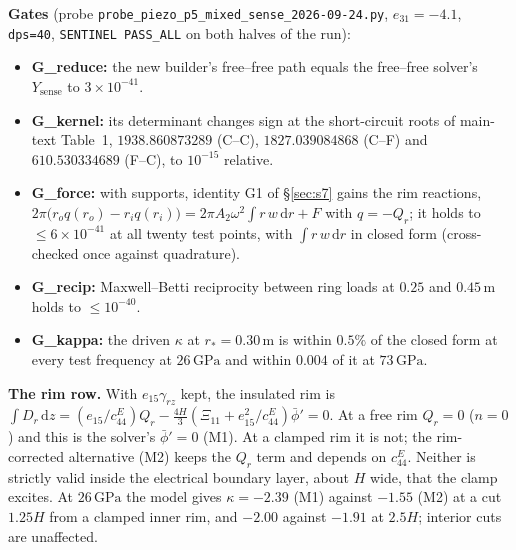 \documentclass[11pt]{article}
\begin{document}
\textbf{Gates} (probe \texttt{probe\_piezo\_p5\_mixed\_sense\_2026-09-24.py},
$e_{31}=-4.1$, \texttt{dps=40}, \texttt{SENTINEL PASS\_ALL} on both
halves of the run):
\begin{itemize}
\item \textbf{G\_reduce:} the new builder's free--free path equals the
free--free solver's $Y_{\mathrm{sense}}$ to $3\times10^{-41}$.
\item \textbf{G\_kernel:} its determinant changes sign at the
short-circuit roots of main-text Table~1, $1938.860873289$ (C--C),
$1827.039084868$ (C--F) and $610.530334689$ (F--C), to $10^{-15}$
relative.
\item \textbf{G\_force:} with supports, identity G1 of \S\ref{sec:s7}
gains the rim reactions,
$2\pi\bigl(r_oq(r_o)-r_iq(r_i)\bigr)=2\pi A_2\omega^2\int r\,w\,\mathrm dr+F$
with $q=-Q_r$; it holds to $\le6\times10^{-41}$ at all twenty test
points, with $\int r\,w\,\mathrm dr$ in closed form (cross-checked once
against quadrature).
\item \textbf{G\_recip:} Maxwell--Betti reciprocity between ring loads
at $0.25$ and $0.45\,\mathrm m$ holds to $\le10^{-40}$.
\item \textbf{G\_kappa:} the driven $\kappa$ at $r_*=0.30\,\mathrm m$ is
within $0.5\%$ of the closed form at every test frequency at
$26\,\mathrm{GPa}$ and within $0.004$ of it at $73\,\mathrm{GPa}$.
\end{itemize}

\textbf{The rim row.} With $e_{15}\gamma_{rz}$ kept, the insulated rim is
$\int D_r\,\mathrm dz=(e_{15}/c_{44}^E)Q_r-\tfrac{4H}{3}(\Xi_{11}+e_{15}^2/c_{44}^E)\bar\phi'=0$.
At a free rim $Q_r=0$ ($n=0$) and this is the solver's $\bar\phi'=0$
(M1). At a clamped rim it is not; the rim-corrected alternative (M2)
keeps the $Q_r$ term and depends on $c_{44}^E$. Neither is strictly
valid inside the electrical boundary layer, about $H$ wide, that the
clamp excites. At $26\,\mathrm{GPa}$ the model gives $\kappa=-2.39$ (M1)
against $-1.55$ (M2) at a cut $1.25H$ from a clamped inner rim, and
$-2.00$ against $-1.91$ at $2.5H$; interior cuts are unaffected.
\end{document}
